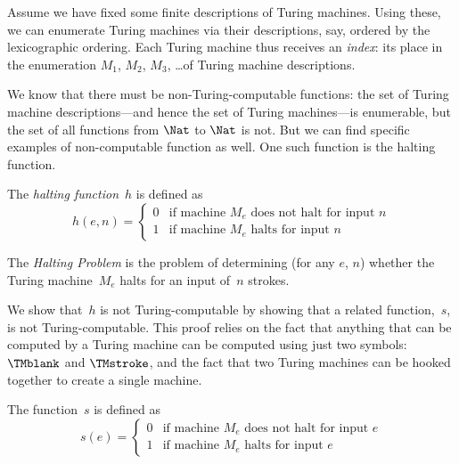\documentclass[../../../include/open-logic-section]{subfiles}
\begin{document}

\begin{explain}
Assume we have fixed some finite descriptions of Turing machines.
Using these, we can enumerate Turing machines via their descriptions,
say, ordered by the lexicographic ordering.  Each Turing machine thus
receives an \emph{index}: its place in the enumeration $M_1$, $M_2$,
$M_3$, \dots of Turing machine descriptions.

We know that there must be non-Turing-computable functions: the set of
Turing machine descriptions---and hence the set of Turing machines---is
enumerable, but the set of all functions from $\Nat$ to $\Nat$ is
not. But we can find specific examples of non-computable function as
well. One such function is the halting function.
\end{explain}

\begin{defn}
 The \emph{halting function}~$h$ is defined as
\[
h(e,n) =
\begin{cases}
  \text{0} & \text{if machine~$M_e$ does not halt for input $n$} \\
  \text{1} & \text{if machine~$M_e$ halts for input $n$}
\end{cases}
\]
\end{defn}

\begin{defn}
The \emph{Halting Problem} is the problem of determining (for any $e$, $n$)
whether the Turing machine~$M_e$ halts for an input of~$n$ strokes.
\end{defn}

\begin{explain}
We show that~$h$ is not Turing-computable by showing that a related
function,~$s$, is not Turing-computable. This proof relies on the fact
that anything that can be computed by a Turing machine can be computed
using just two symbols: $\TMblank$ and $\TMstroke$, and the fact that two
Turing machines can be hooked together to create a single machine.
\end{explain}

\begin{defn} The function~$s$ is defined as
\[
s(e) =
\begin{cases}
  \text{0} & \text{if machine~$M_e$ does not halt for input $e$} \\
  \text{1} & \text{if machine~$M_e$ halts for input $e$}
\end{cases}
\]
\end{defn}
\end{document}
